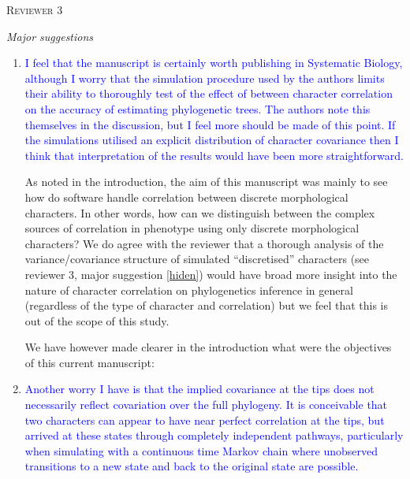 \documentclass[12pt,letterpaper]{article}
\renewcommand{\section}[1]{%
\bigskip
\begin{center}
\begin{Large}
\normalfont\scshape #1
\medskip
\end{Large}
\end{center}}
\renewcommand{\subsection}[1]{%
\bigskip
\begin{center}
\begin{large}
\normalfont\itshape #1
\end{large}
\end{center}}
\begin{document}
%
%





\section{Reviewer 3}

\subsection{Major suggestions}

\begin{enumerate}

\item{\textcolor{blue}{I feel that the manuscript is certainly worth publishing in Systematic Biology, although I worry that the simulation procedure used by the authors limits their ability to thoroughly test of the effect of between character correlation on the accuracy of estimating phylogenetic trees. The authors note this themselves in the discussion, but I feel more should be made of this point. If the simulations utilised an explicit distribution of character covariance then I think that interpretation of the results would have been more straightforward.}}

As noted in the introduction, the aim of this manuscript was mainly to see how do software handle correlation between discrete morphological characters.
In other words, how can we distinguish between the complex sources of correlation in phenotype using only discrete morphological characters?
We do agree with the reviewer that a thorough analysis of the variance/covariance structure of simulated ``discretised'' characters (see reviewer 3, major suggestion \ref{hiden}) would have broad more insight into the nature of character correlation on phylogenetics inference in general (regardless of the type of character and correlation) but we feel that this is out of the scope of this study.

We have however made clearer in the introduction what were the objectives of this current manuscript:



\item{\textcolor{blue}{Another worry I have is that the implied covariance at the tips does not necessarily reflect covariation over the full phylogeny. It is conceivable that two characters can appear to have near perfect correlation at the tips, but arrived at these states through completely independent pathways, particularly when simulating with a continuous time Markov chain where unobserved transitions to a new state and back to the original state are possible.}}
\label{hiden}


\end{enumerate}
\end{document}
